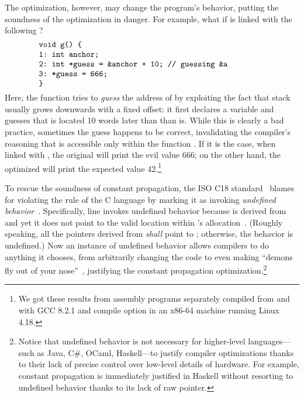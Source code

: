 The optimization, however, may change the program's behavior, putting the soundness of the
optimization in danger.  For example, what if  is linked with the following ?
%
\[
\begin{minipage}{0.8\textwidth}
\begin{verbatim}
void g() {
1: int anchor;
2: int *guess = &anchor + 10; // guessing &a
3: *guess = 666;
}
\end{verbatim}
\end{minipage}
\]
%
\noindent Here, the function  tries to \emph{guess} the address of  by exploiting
the fact that stack usually grows downwards with a fixed offset: it first declares a variable
 and guesses that  is located 10 words later than than  is.  While
this is clearly a bad practice, sometimes the guess happens to be correct, invalidating the
compiler's reasoning that  is accessible only within the function .  If it is the
case, when linked with , the original  will print the evil value 666; on the
other hand, the optimized  will print the expected value 42.\footnote{We got these results
  from assembly programs separately compiled from  and  with GCC 8.2.1 and
  compile option  in an x86-64 machine running Linux 4.18.}

To rescue the soundness of constant propagation, the ISO C18 standard~\cite{c18} blames 
for violating the rule of the C language by marking it as invoking \emph{undefined
  behavior}~\cite[\S3.4.3p1]{c18}.  Specifically, line  invokes undefined behavior because
 is derived from  and yet it does not point to the valid location within
's allocation~\cite[\S6.5.6p8]{c18}.  (Roughly speaking, all the pointers derived from
 \emph{shall} point to ; otherwise, the behavior is undefined.)  Now an
instance of undefined behavior allows compilers to do anything it chooses, from arbitrarily changing
the code to even making ``demons fly out of your nose''~\cite{nasal-demons}, justifying the constant
propagation optimization.\footnote{Notice that undefined behavior is not necessary for higher-level
  languages---such as Java, C\#, OCaml, Haskell---to justify compiler optimizations thanks to their
  lack of precise control over low-level details of hardware.  For example, constant propagation is
  immediately justified in Haskell without resorting to undefined behavior thanks to its lack of raw
  pointer.}

